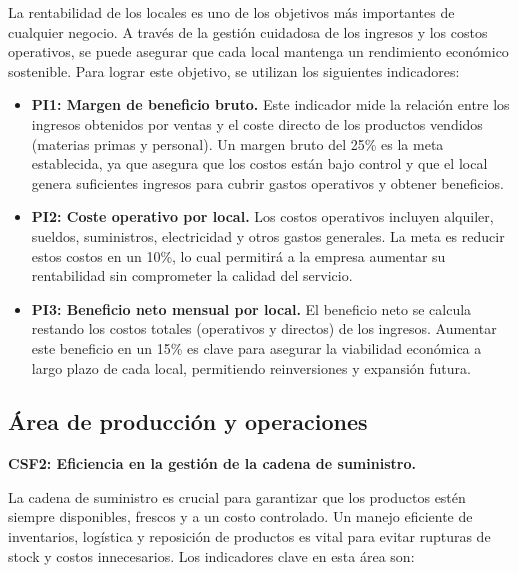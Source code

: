 \documentclass[12pt]{opticajnl}
\begin{document}
La rentabilidad de los locales es uno de los objetivos más importantes de cualquier negocio. A través de la gestión cuidadosa de los ingresos y los costos operativos, se puede asegurar que cada local mantenga un rendimiento económico sostenible. Para lograr este objetivo, se utilizan los siguientes indicadores:

\begin{itemize}
    \item \textbf{PI1: Margen de beneficio bruto.}  
    Este indicador mide la relación entre los ingresos obtenidos por ventas y el coste directo de los productos vendidos (materias primas y personal). Un margen bruto del 25\% es la meta establecida, ya que asegura que los costos están bajo control y que el local genera suficientes ingresos para cubrir gastos operativos y obtener beneficios.
    
    \item \textbf{PI2: Coste operativo por local.}  
    Los costos operativos incluyen alquiler, sueldos, suministros, electricidad y otros gastos generales. La meta es reducir estos costos en un 10\%, lo cual permitirá a la empresa aumentar su rentabilidad sin comprometer la calidad del servicio.
    
    \item \textbf{PI3: Beneficio neto mensual por local.}  
    El beneficio neto se calcula restando los costos totales (operativos y directos) de los ingresos. Aumentar este beneficio en un 15\% es clave para asegurar la viabilidad económica a largo plazo de cada local, permitiendo reinversiones y expansión futura.
\end{itemize}

\subsection{Área de producción y operaciones}

\textbf{CSF2: Eficiencia en la gestión de la cadena de suministro.}

La cadena de suministro es crucial para garantizar que los productos estén siempre disponibles, frescos y a un costo controlado. Un manejo eficiente de inventarios, logística y reposición de productos es vital para evitar rupturas de stock y costos innecesarios. Los indicadores clave en esta área son:
\end{document}
